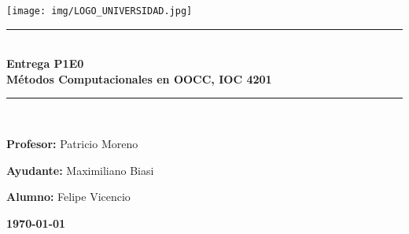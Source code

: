 \documentclass{article} %
\begin{document}
\begin{titlepage}%
\newcommand{\HRule}{\rule{\linewidth}{0.5mm}} 
\center 
\texttt{[image: img/LOGO\_UNIVERSIDAD.jpg]}\\ %
\vspace{3cm}
\HRule \\[0.4cm]
{ \huge \bfseries Entrega P1E0}\\[0.4cm] %
{ \huge \bfseries Métodos Computacionales en OOCC, IOC 4201}\\[0.4cm] %
\HRule \\[1.5cm]
 \vspace{5cm}
\begin{flushright}
    { \textbf{Profesor:} Patricio Moreno\\}
\end{flushright}
\vspace{0,2cm}

\begin{flushright}
    { \textbf{Ayudante:} Maximiliano Biasi\\}
\end{flushright}
\vspace{0,2cm}

\begin{flushright}
    { \textbf{Alumno:} Felipe Vicencio\\}
\end{flushright}
\vspace{2cm}
{\large \textbf{\today}}\\[2cm] %
\end{titlepage}
\end{document}
